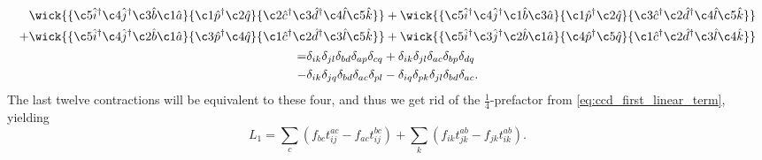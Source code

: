 \begin{gather}
    \begin{aligned}
        &\wick{
        \{\c5{\hat{i}}^\dagger \c4{\hat{j}}^\dagger \c3{\hat{b}} \c1{\hat{a}} \}
        \{\c1{\hat{p}}^\dagger \c2{\hat{q}}\} 
        \{\c2{\hat{c}}^\dagger \c3{\hat{d}}^\dagger \c4{\hat{l}} \c5{\hat{k}} \} 
        } + 
        \wick{
        \{\c5{\hat{i}}^\dagger \c4{\hat{j}}^\dagger \c1{\hat{b}} \c3{\hat{a}} \}
        \{\c1{\hat{p}}^\dagger \c2{\hat{q}}\} 
        \{\c3{\hat{c}}^\dagger \c2{\hat{d}}^\dagger \c4{\hat{l}} \c5{\hat{k}} \} 
        } \\ +
        &\wick{
        \{\c5{\hat{i}}^\dagger \c4{\hat{j}}^\dagger \c2{\hat{b}} \c1{\hat{a}} \}
        \{\c3{\hat{p}}^\dagger \c4{\hat{q}}\} 
        \{\c1{\hat{c}}^\dagger \c2{\hat{d}}^\dagger \c3{\hat{l}} \c5{\hat{k}} \} 
        } +
        \wick{
        \{\c5{\hat{i}}^\dagger \c3{\hat{j}}^\dagger \c2{\hat{b}} \c1{\hat{a}} \}
        \{\c4{\hat{p}}^\dagger \c5{\hat{q}}\} 
        \{\c1{\hat{c}}^\dagger \c2{\hat{d}}^\dagger \c3{\hat{l}} \c4{\hat{k}} \} 
        }
    \end{aligned} \\
    \begin{aligned}
         =&\delta_{ik}\delta_{jl}\delta_{bd}\delta_{ap}\delta_{cq}
         +\delta_{ik}\delta_{jl}\delta_{ac}\delta_{bp}\delta_{dq} \\
         -&\delta_{ik}\delta_{jq}\delta_{bd}\delta_{ac}\delta_{pl}
         -\delta_{iq}\delta_{pk}\delta_{jl}\delta_{bd}\delta_{ac}.
    \end{aligned}
\end{gather}
The last twelve contractions will be equivalent to these four, and thus we get rid 
of the $\frac{1}{4}$-prefactor from \autoref{eq:ccd_first_linear_term}, yielding
\begin{equation}
    L_1 = \sum_c(f_{bc} t^{ac}_{ij} - f_{ac} t^{bc}_{ij}) + \sum_k (f_{ik} t^{ab}_{jk} - f_{jk} t^{ab}_{ik}).
\end{equation}

